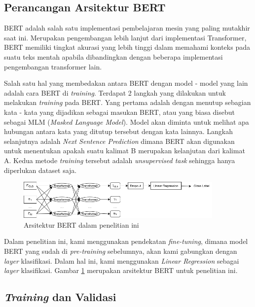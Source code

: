 \subsection{Perancangan Arsitektur BERT}
BERT adalah salah satu implementasi pembelajaran mesin yang paling mutakhir saat ini. Merupakan pengembangan lebih lanjut dari implementasi Transformer, BERT memiliki tingkat akurasi yang lebih tinggi dalam memahami konteks pada suatu teks mentah apabila dibandingkan dengan beberapa implementasi pengembangan transformer lain.

Salah satu hal yang membedakan antara BERT dengan model - model yang lain adalah cara BERT di \textit{training}. Terdapat 2 langkah yang dilakukan untuk melakukan \textit{training} pada BERT. Yang pertama adalah dengan menutup sebagian kata - kata yang dijadikan sebagai masukan BERT, atau yang biasa disebut sebagai MLM (\textit{Masked Language Model}). Model akan diminta untuk melihat apa hubungan antara kata yang ditutup tersebut dengan kata lainnya. Langkah selanjutnya adalah \textit{Next Sentence Prediction} dimana BERT akan digunakan untuk menentukan apakah suatu kalimat B merupakan kelanjutan dari kalimat A. Kedua metode \textit{training} tersebut adalah \textit{unsupervised task} sehingga hanya diperlukan dataset saja.

\begin{figure}[h!]
    \begin{center}
        \includegraphics[width= 0.9\textwidth]{gambar/bert_arch.png}
        \caption{Arsitektur BERT dalam penelitian ini}
        \label{fig: bert_arch}
    \end{center}
\end{figure}


Dalam penelitian ini, kami menggunakan pendekatan \textit{fine-tuning}, dimana model BERT yang sudah di \textit{pre-training} sebelumnya, akan kami gabungkan dengan \textit{layer} klasifikasi. Dalam hal ini, kami menggunakan \textit{Linear Regression} sebagai \textit{layer} klasifikasi. Gambar \ref{fig: bert_arch} merupakan arsitektur BERT untuk penelitian ini.

\subsection{\textit{Training} dan Validasi}

